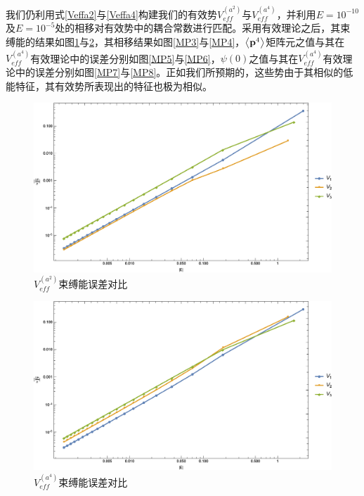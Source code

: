 \documentclass[cs4size,titlepage,twoside]{ctexart}
\begin{document}
我们仍利用式\eqref{Veffa2}与\eqref{Veffa4}构建我们的有效势$V_{eff}^{(a^2)}$与$V_{eff}^{(a^4)}$，并利用$E=10^{-10}$及$E=10^{-5}$处的相移对有效势中的耦合常数进行匹配。采用有效理论之后，其束缚能的结果如图\ref{MP1}与\ref{MP2}，其相移结果如图\ref{MP3}与\ref{MP4}，$\expval{\vb{p}^4}$矩阵元之值与其在$V_{eff}^{(a^4)}$有效理论中的误差分别如图\ref{MP5}与\ref{MP6}，$\psi(0)$之值与其在$V_{eff}^{(a^4)}$有效理论中的误差分别如图\ref{MP7}与\ref{MP8}。正如我们所预期的，这些势由于其相似的低能特征，其有效势所表现出的特征也极为相似。
\begin{figure}[!htbp]
	\centering
	\includegraphics[width=6in]{MultiplePotential_3.eps}
	\caption{$V_{eff}^{(a^2)}$束缚能误差对比}\label{MP1}
\end{figure}
\begin{figure}[!tp]
	\centering
	\includegraphics[width=6in]{MultiplePotential_5.eps}
	\caption{$V_{eff}^{(a^4)}$束缚能误差对比}\label{MP2}
\end{figure}
\end{document}
